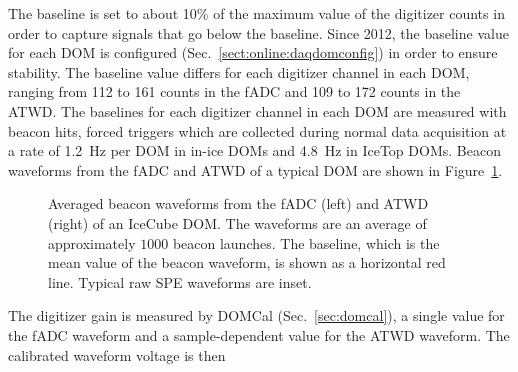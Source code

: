 The baseline is set to about 10\% of the maximum value of the
digitizer counts in
order to capture signals that go below the baseline. Since 2012, the
baseline value for each DOM is configured (Sec.~\ref{sect:online:daqdomconfig}) in order to ensure 
stability. The baseline value differs for each digitizer channel in
each DOM, ranging from 112 to 161 counts in the fADC and 109 to 172
counts in the ATWD. The baselines for each digitizer channel in each DOM are measured with
beacon hits, forced triggers which are collected during normal data
acquisition at a rate of 1.2~Hz per DOM
in in-ice DOMs and 4.8~Hz in IceTop DOMs. Beacon waveforms
from the fADC and ATWD of a typical DOM are shown in Figure~\ref{fig:raw_baselines}.

\begin{figure}[!h]
  \captionsetup[subfigure]{labelformat=empty}
  \centering
  \caption{Averaged beacon waveforms from the fADC (left) and ATWD (right) of
    an IceCube DOM. The waveforms are an average of approximately $1000$ beacon
   launches. The baseline, which is the mean value of the
    beacon waveform, is shown as a horizontal red line. Typical raw SPE
    waveforms are inset.}
  \label{fig:raw_baselines}
\end{figure}

The digitizer gain is measured by DOMCal (Sec.~\ref{sec:domcal}), a single
value for the fADC waveform and a sample-dependent value for the ATWD
waveform. The calibrated waveform voltage is then

